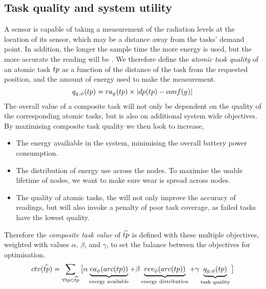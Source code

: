 \newcommand{\functionAtomicTaskQualitySignature}[2]{
	\functionSignature{q_{\varAgent{}{}, \varTime{}{}}} {\varAtomicTask{}{}}
}
\newcommand{\functionCompositeTaskValue}[2]{
	\functionSignature{ctv}{\varCompositeTask{}{}}
}

\newcommand{\functionSystemUtility}[2]{\functionSignature{u_{\setTime{}{}}}{\setCompositeTask{}{}}}
\subsection*{Task quality and system utility}

A sensor is capable of taking a measurement of the radiation levels at the location of its sensor, which may be a distance away from the tasks' demand point. In addition, the longer the sample time the more energy is used, but the more accurate the reading will be \cite{dummy}. We therefore define the \textit{atomic task quality} of an atomic task $\varAtomicTask{}{}$ as a function of the distance of the task from the requested position, and the amount of energy used to make the measurement.
	\begin{equation}
		\functionAtomicTaskQualitySignature{}{} = \functionTaskResourceAllocation{}{} \times \funcSize{
				\functionTaskDemandPoint{}{} - \functionDeployment{\varAgent{}{}}{}
		}{}
	\end{equation}
The overall value of a composite task will not only be dependent on the quality of the corresponding atomic tasks, but is also on additional system wide objectives.
By maximising composite task quality we then look to increase,
\begin{itemize}
	\item The energy availiable in the system, minimising the overall battery power consumption.
	\item The distribution of energy use across the nodes. To maximise the usable lifetime of nodes, we want to make sure wear is spread across nodes. 
	\item The quality of atomic tasks, the will not only improve the accuracy of readings, but will also invoke a penalty of poor task coverage, as failed tasks have the lowest quality.
\end{itemize}
 Therefore the \textit{composite task value} of $\varCompositeTask{}{}$ is defined with these multiple objectives, weighted with values $\alpha$, $\beta$, and $\gamma$, to set the balance between the objectives for optimisation.
	\begin{equation}
		\functionCompositeTaskValue{}{} = 
		\sum_{\forall \varAtomicTask{}{} \in \varCompositeTask{}{}}
		\big\lbrack
		\alpha\underbrace{\functionEnergyAvailable{\functionTaskArc{}{}}{}}_{\text{energy available}}
		+ \beta\underbrace{\functionEnergyVariability{\functionTaskArc{}{}}{}}_{\text{energy distribution}}
		+ 
		\gamma\underbrace{\functionAtomicTaskQualitySignature{}{}}_{\text{task quality}}
		\big\rbrack
	\end{equation}
